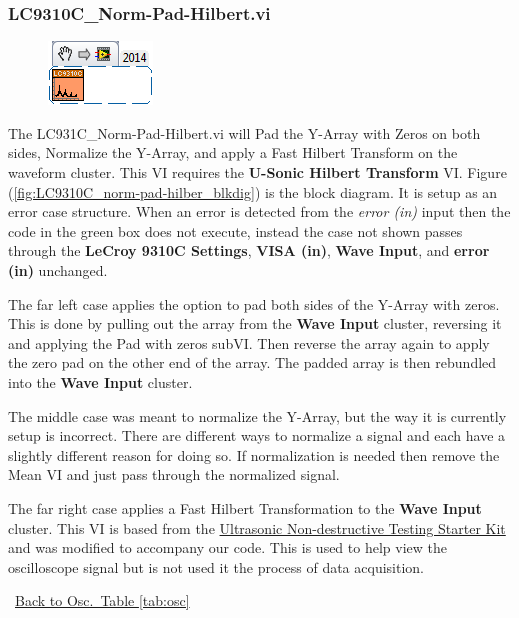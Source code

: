\documentclass[11pt,a4paper,oldfontcommands]{memoir}
\begin{document}
\subsubsection{LC9310C\_Norm-Pad-Hilbert.vi} \label{LC9310C_nph}
\noindent\hrulefill

\begin{figure}[H]
	\includegraphics[scale=0.625]{LC931C_norm-pad-hilbert_main_01}
	\label{fig:LC9310C_norm-pad-hilbert_main_01}
\end{figure}

The LC931C\_Norm-Pad-Hilbert.vi will Pad the Y-Array with Zeros on both sides, Normalize the Y-Array, and apply a Fast Hilbert Transform on the waveform cluster. This VI requires the \textbf{U-Sonic Hilbert Transform} VI. Figure (\ref{fig:LC9310C_norm-pad-hilber_blkdig}) is the block diagram.  It is setup as an error case structure. When an error is detected from the \textit{error (in)} input then the code in the green box does not execute, instead the case not shown passes through the \textbf{LeCroy 9310C Settings}, \textbf{VISA (in)}, \textbf{Wave Input}, and \textbf{error (in)} unchanged.

The far left case applies the option to pad both sides of the Y-Array with zeros. This is done by pulling out the array from the \textbf{Wave Input} cluster, reversing it and applying the Pad with zeros subVI. Then reverse the array again to apply the zero pad on the other end of the array. The padded array is then rebundled into the \textbf{Wave Input} cluster.

The middle case was meant to normalize the Y-Array, but the way it is currently setup is incorrect. There are different ways to normalize a signal and each have a slightly different reason for doing so. If normalization is needed then remove the Mean VI and just pass through the normalized signal.

The far right case applies a Fast Hilbert Transformation to the \textbf{Wave Input} cluster. This VI is based from the \href{http://www.ni.com/example/28618/en/}{Ultrasonic Non-destructive Testing Starter Kit} and was modified to accompany our code. This is used to help view the oscilloscope signal but is not used it the process of data acquisition.

\noindent\hrulefill\, \hyperref[tab:osc]{Back to Osc.\ Table \ref{tab:osc}}
\end{document}
